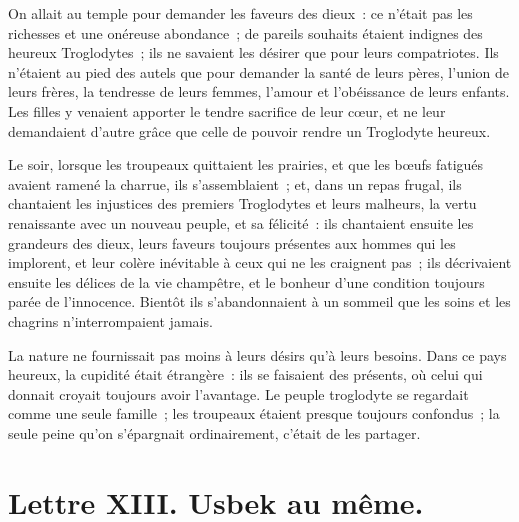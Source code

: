 \documentclass[french,twoside]{book} %
\newcommand{\dateline}[1]{\medskip{\RaggedLeft{#1}\par}\bigskip}
\begin{document}
On allait au temple pour demander les faveurs des dieux : ce n’était pas les richesses et une onéreuse abondance ; de pareils souhaits étaient indignes des heureux Troglodytes ; ils ne savaient les désirer que pour leurs compatriotes. Ils n’étaient au pied des autels que pour demander la santé de leurs pères, l’union de leurs frères, la tendresse de leurs femmes, l’amour et l’obéissance de leurs enfants. Les filles y venaient apporter le tendre sacrifice de leur cœur, et ne leur demandaient d’autre grâce que celle de pouvoir rendre un Troglodyte heureux.\par
Le soir, lorsque les troupeaux quittaient les prairies, et que les bœufs fatigués avaient ramené la charrue, ils s’assemblaient ; et, dans un repas frugal, ils chantaient les injustices des premiers Troglodytes et leurs malheurs, la vertu renaissante avec un nouveau peuple, et sa félicité : ils chantaient ensuite les grandeurs des dieux, leurs faveurs toujours présentes aux hommes qui les implorent, et leur colère inévitable à ceux qui ne les craignent pas ; ils décrivaient ensuite les délices de la vie champêtre, et le bonheur d’une condition toujours parée de l’innocence. Bientôt ils s’abandonnaient à un sommeil que les soins et les chagrins n’interrompaient jamais.\par
La nature ne fournissait pas moins à leurs désirs qu’à leurs besoins. Dans ce pays heureux, la cupidité était étrangère : ils se faisaient des présents, où celui qui donnait croyait toujours avoir l’avantage. Le peuple troglodyte se regardait comme une seule famille ; les troupeaux étaient presque toujours confondus ; la seule peine qu’on s’épargnait ordinairement, c’était de les partager.\par

\dateline{D’Erzeron, le 6 de la lune de Gemmai 2, 1711.}
\section[{Lettre XIII. Usbek au même.}]{Lettre XIII. Usbek au même.}\renewcommand{\leftmark}{Lettre XIII. Usbek au même.}
\end{document}
